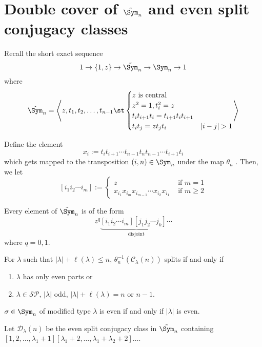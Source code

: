 \documentclass[11pt,leqno,oneside]{amsbook}
\newcommand{\SP}{\mathcal{SP}} %
\newcommand{\CC}{\mathcal{C}} %
\renewcommand{\D}{\mathcal{D}} %
\numberwithin{thm}{section}
\begin{document}
\section{Double cover of \(\tilde{\Sym}_n\) and even split conjugacy
  classes}
Recall the short exact sequence \[
  1 \to \{1,z\} \to \tilde{\Sym}_n \to \Sym_n \to 1
\]
where \[
  \tilde{\Sym}_n = \left\langle z,t_1,t_2,\ldots,t_{n-1} \st
  \begin{cases}
    z \text{ is central}\\
    z^2 = 1, t_i^2 = z\\
    t_i t_{i+1} t_i = t_{i+1} t_i t_{i+1} \\
    t_i t_j = z t_j t_i & |i-j|>1
  \end{cases}
\right\rangle
\]
\begin{defn}
  Define the element \[
    x_i := t_i t_{i+1} \cdots t_{n-1} t_n t_{n-1} \cdots t_{i+1} t_i
  \]
  which gets mapped to the transposition \((i,n) \in \Sym_n\) under
  the map \(\theta_n\) . Then, we let \[
    [i_1 i_2 \cdots i_m] :=
    \begin{cases}
      z & \text{ if } m=1\\
      x_{i_1} x_{i_m} x_{i_{m-1}} \cdots x_{i_2} x_{i_1} & \text{ if }
      m \geq 2
    \end{cases}
  \]
\end{defn}
\begin{prop}
  Every element of \(\tilde{\Sym}_n\) is of the form \[
    z^q \underbrace{[i_1 i_2 \cdots i_m][j_1 j_2 \cdots j_k] \cdots}_{\text{disjoint}}
  \]
  where \(q=0,1\).
\end{prop}
\begin{lem}
  For \(\lambda\) such that \(|\lambda|+\ell(\lambda) \leq n\), \(
  \theta_n^{-1}(\CC_\lambda(n)) \) splits if and only if
  \begin{enumerate}
  \item \(\lambda\) has only even parts or
  \item \(\lambda \in \SP\), \(|\lambda|\) odd,
    \(|\lambda|+\ell(\lambda) = n\) or \(n-1\).
  \end{enumerate}
\end{lem}
\begin{prop}
  \(\sigma \in \Sym_n\) of modified type \(\lambda\) is even if and
  only if \(|\lambda|\) is even.
\end{prop}
\begin{defn}
  Let \(\D_\lambda(n)\) be the even split conjugacy class in
  \(\tilde{\Sym}_n\) containing
  \([1,2,\ldots,\lambda_1+1][\lambda_1+2,\ldots,
  \lambda_1+\lambda_2+2] \ldots\).
\end{defn}
\end{document}
